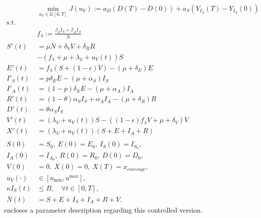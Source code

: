 \begin{equation}
    \label{eqn:optimal_control_problem}
    \begin{aligned}
        &\min_{u_V  \in \mathcal{U}[0, T]}
        J(u_V) :=
        a_D ( D(T) - D(0)) +
        a_S (Y_{I_S}(T) - Y_{I_S}(0))
        \\
        \text{s.t.} &
        \\
        &f_{\lambda}
        :=
        \frac{\beta_S I_S + \beta_AI_A}{\bar{N}}
        \\
        S'(t)
        &=
        \mu \bar{N} + \delta_V V + \delta_R R
        \\
        &-
        (f_{\lambda} + \mu + \lambda_V +  u_V(t)) S
        \\
        E'(t)
        &=
        f_{\lambda} (S + (1-\epsilon) V)
        - (\mu+\delta_E) E
        \\
        I'_S(t)
        &=p
        \delta_E
        E-(\mu + \alpha_S) I_S
        \\
        I'_A(t)
        &= (1 - p) \delta_E E-(\mu + \alpha_A) I_A
        \\
        R'(t)
        &= (1 - \theta) \alpha_S I_S + \alpha_A I_A
        - (\mu + \delta_R) R
        \\
        D'(t)&=
        \theta \alpha_S I_S
        \\
        V'(t)&=
        (\lambda_V + u_V(t)) S -
        \left(
        (1 -\epsilon) f_{\lambda} V +
        \mu + \delta_V
        \right) V
        \\
        X'(t)&=
        (\lambda_V + u_V(t))(S + E + I_A + R)
        \\
        \\
        S(0) &= S_0, \ E(0) = E_0, \ I_S(0) = I_{S_{0}},
        \\
        I_A(0) &= I_{A_{0}}, \ R(0) = R_0, \ D(0) = D_0,
        \\
        V(0) &= 0, \ X(0) = 0, \ X(T) = x_{coverage},
        \\
        u_V(\cdot) & \in [u_{\min}, u^{\max}],
        \\
        \kappa I_S(t) & \leq B, \quad \forall t \in [0, T],
        \\
        \bar{N}(t) &= S + E + I_S + I_A + R + V.
    \end{aligned}
\end{equation}
 encloses a
parameter description
regarding this controlled version.

